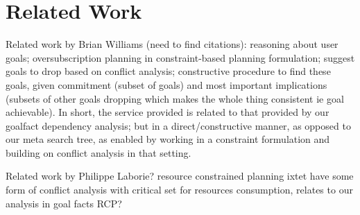 \section{Related Work}
\label{related}


Related work by Brian Williams (need to find citations): reasoning
about user goals; oversubscription planning in constraint-based
planning formulation; suggest goals to drop based on conflict
analysis; constructive procedure to find these goals, given commitment
(subset of goals) and most important implications (subsets of other
goals dropping which makes the whole thing consistent ie goal
achievable). In short, the service provided is related to that
provided by our goalfact dependency analysis; but in a
direct/constructive manner, as opposed to our meta search tree, as
enabled by working in a constraint formulation and building on
conflict analysis in that setting.

Related work by Philippe Laborie? resource constrained planning ixtet
have some form of conflict analysis with critical set for resources
consumption, relates to our analysis in goal facts RCP?
